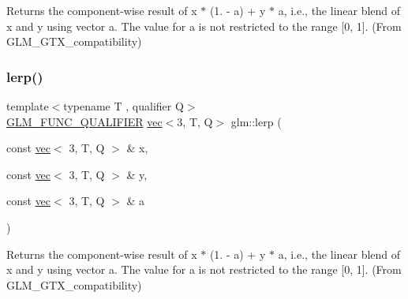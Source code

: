 Returns the component-\/wise result of x $\ast$ (1. -\/ a) + y $\ast$ a, i.\+e., the linear blend of x and y using vector a. The value for a is not restricted to the range \mbox{[}0, 1\mbox{]}. (From G\+L\+M\+\_\+\+G\+T\+X\+\_\+compatibility) 

\mbox{\label{group__gtx__compatibility_ga4ae1a616c8540a2649eab8e0cd051bb3}} 
\subsubsection{\texorpdfstring{lerp()}{lerp()}\hspace{0.1cm}{\footnotesize\ttfamily [6/7]}}
{\footnotesize\ttfamily template$<$typename T , qualifier Q$>$ \\
\mbox{\hyperlink{setup_8hpp_a33fdea6f91c5f834105f7415e2a64407}{G\+L\+M\+\_\+\+F\+U\+N\+C\+\_\+\+Q\+U\+A\+L\+I\+F\+I\+ER}} \mbox{\hyperlink{structglm_1_1vec}{vec}}$<$3, T, Q$>$ glm\+::lerp (\begin{DoxyParamCaption}\item[{const \mbox{\hyperlink{structglm_1_1vec}{vec}}$<$ 3, T, Q $>$ \&}]{x,  }\item[{const \mbox{\hyperlink{structglm_1_1vec}{vec}}$<$ 3, T, Q $>$ \&}]{y,  }\item[{const \mbox{\hyperlink{structglm_1_1vec}{vec}}$<$ 3, T, Q $>$ \&}]{a }\end{DoxyParamCaption})}



Returns the component-\/wise result of x $\ast$ (1. -\/ a) + y $\ast$ a, i.\+e., the linear blend of x and y using vector a. The value for a is not restricted to the range \mbox{[}0, 1\mbox{]}. (From G\+L\+M\+\_\+\+G\+T\+X\+\_\+compatibility) 

\mbox{\label{group__gtx__compatibility_gab5477ab69c40de4db5d58d3359529724}} 
